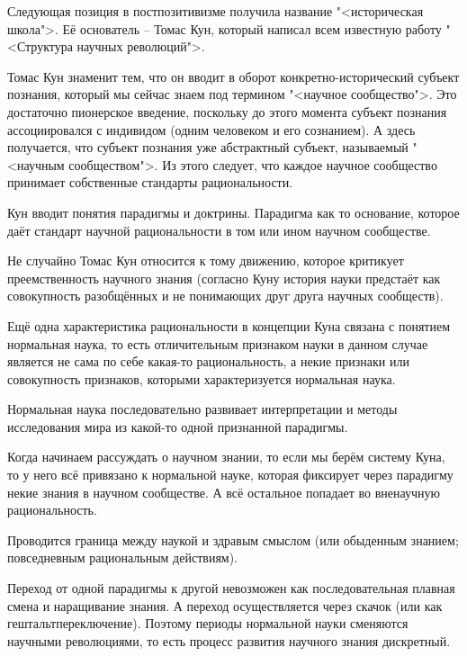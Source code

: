 \documentclass[main.tex]{subfiles}
\begin{document}


Следующая позиция в постпозитивизме получила название "<историческая школа">.
Её основатель -- Томас Кун, который написал всем известную работу "<Структура научных революций">.

Томас Кун знаменит тем, что он вводит в оборот конкретно-исторический субъект познания, который мы сейчас знаем под термином "<научное сообщество">.
Это достаточно пионерское введение, поскольку до этого момента субъект познания ассоциировался с индивидом (одним человеком и его сознанием).
А здесь получается, что субъект познания уже абстрактный субъект, называемый "<научным сообществом">.
Из этого следует, что каждое научное сообщество принимает собственные стандарты рациональности.

Кун вводит понятия парадигмы и доктрины.
Парадигма как то основание, которое даёт стандарт научной рациональности в том или ином научном сообществе.

Не случайно Томас Кун относится к тому движению, которое критикует преемственность научного знания (согласно Куну история науки предстаёт как совокупность разобщённых и не понимающих друг друга научных сообществ).


Ещё одна характеристика рациональности в концепции Куна связана с понятием нормальная наука, то есть отличительным признаком науки в данном случае является не сама по себе какая-то рациональность, а некие признаки или совокупность признаков, которыми характеризуется нормальная наука.

Нормальная наука последовательно развивает интерпретации и методы исследования мира из какой-то одной признанной парадигмы.

Когда начинаем рассуждать о научном знании, то если мы берём систему Куна, то у него всё привязано к нормальной науке, которая фиксирует через парадигму некие знания в научном сообществе.
А всё остальное попадает во вненаучную рациональность.

Проводится граница между наукой и здравым смыслом (или обыденным знанием; повседневным рациональным действиям).

Переход от одной парадигмы к другой невозможен как последовательная плавная смена и наращивание знания.
А переход осуществляется через скачок (или как гештальтпереключение).
Поэтому периоды нормальной науки сменяются научными революциями, то есть процесс развития научного знания дискретный.
\end{document}
